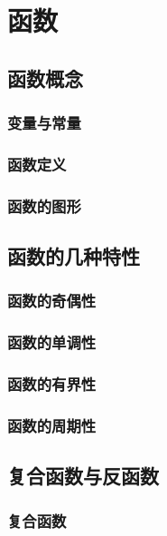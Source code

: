 

\chapter{函\emspace 数}\label{ch:1}
\section{函数概念}\label{sec:1.1}
\subsection{变量与常量}
\subsection{函数定义}
\subsection{函数的图形}
\begin{exercise}

\end{exercise}
\section{函数的几种特性}
\subsection{函数的奇偶性}
\subsection{函数的单调性}
\subsection{函数的有界性}
\subsection{函数的周期性}
\begin{exercise}

\end{exercise}

\section{复合函数与反函数}
\subsection{复合函数}

